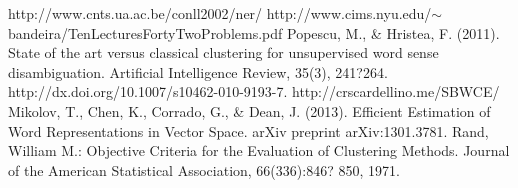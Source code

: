 \documentclass[]{article}
\begin{document}
	
	\begin{thebibliography}{1}
		 http://www.cnts.ua.ac.be/conll2002/ner/
		http://www.cims.nyu.edu/$\sim$bandeira/TenLecturesFortyTwoProblems.pdf
		 Popescu, M., \& Hristea, F. (2011). State of the art versus classical clustering for unsupervised word sense disambiguation. Artificial Intelligence Review, 35(3), 241?264. http://dx.doi.org/10.1007/s10462-010-9193-7.  
		 http://crscardellino.me/SBWCE/
		 Mikolov, T., Chen, K., Corrado, G., \& Dean, J. (2013). Efficient Estimation of Word Representations in Vector Space. arXiv preprint arXiv:1301.3781. 
		Rand, William M.: Objective Criteria for the Evaluation of Clustering Methods. Journal of the American Statistical Association, 66(336):846? 850, 1971.
	\end{thebibliography} 
	
	
\end{document}
